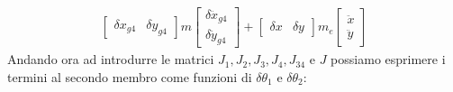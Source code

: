 \begin{equation}
\begin{split}
\begin{bmatrix}
\delta x_{g4} & \delta y_{g4}
\end{bmatrix}m\begin{bmatrix}
\delta \ddot{x}_{g4} \\ \delta \ddot{y}_{g4} \end{bmatrix} + \begin{bmatrix}
\delta x & \delta y
\end{bmatrix}m_e \begin{bmatrix}
\ddot{x} \\ \ddot{y}
\end{bmatrix}
\end{split}
\label{eq:DinamicaGrande}
\end{equation}
Andando ora ad introdurre le matrici $J_1, J_2, J_3, J_4, J_{34}$ e $J$ possiamo esprimere i termini al secondo membro come funzioni di $\delta\theta_1$ e $\delta\theta_2$:
